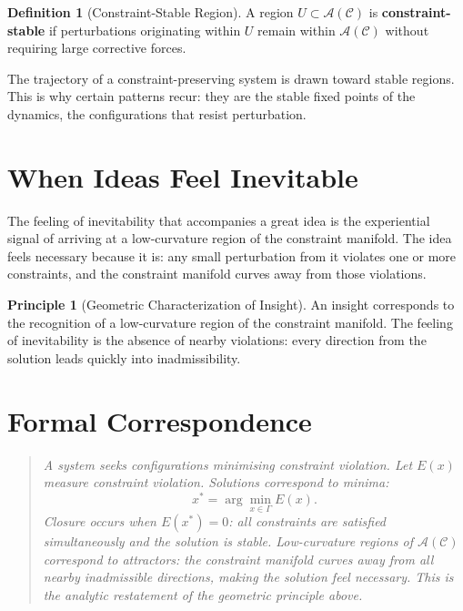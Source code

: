 \documentclass[11pt]{book}
\theoremstyle{plain}
\theoremstyle{definition}
\newtheorem{definition}[theorem]{Definition}
\newtheorem{principle}[theorem]{Principle}
\theoremstyle{remark}
\newcommand{\C}{\mathcal{C}}
\newcommand{\A}{\mathcal{A}}
\newenvironment{formalcorrespondence}
  {\begin{quote}\small\itshape}
  {\end{quote}}
\begin{document}
\begin{definition}[Constraint-Stable Region]
A region $U \subset \A(\C)$ is \textbf{constraint-stable} if perturbations
originating within $U$ remain within $\A(\C)$ without requiring large
corrective forces.
\end{definition}

The trajectory of a constraint-preserving system is drawn toward stable
regions. This is why certain patterns recur: they are the stable fixed
points of the dynamics, the configurations that resist perturbation.

\section{When Ideas Feel Inevitable}

The feeling of inevitability that accompanies a great idea is the
experiential signal of arriving at a low-curvature region of the constraint
manifold. The idea feels necessary because it is: any small perturbation
from it violates one or more constraints, and the constraint manifold
curves away from those violations.

\begin{principle}[Geometric Characterization of Insight]
An insight corresponds to the recognition of a low-curvature region of
the constraint manifold. The feeling of inevitability is the absence of
nearby violations: every direction from the solution leads quickly into
inadmissibility.
\end{principle}

\section*{Formal Correspondence}
\begin{formalcorrespondence}
A system seeks configurations minimising constraint violation. Let
$E(x)$ measure constraint violation. Solutions correspond to minima:
\[
  x^* = \arg\min_{x \in \Gamma} E(x).
\]
Closure occurs when $E(x^*) = 0$: all constraints are satisfied
simultaneously and the solution is stable. Low-curvature regions of
$\A(\C)$ correspond to attractors: the constraint manifold curves away
from all nearby inadmissible directions, making the solution feel
necessary. This is the analytic restatement of the geometric principle
above.
\end{formalcorrespondence}
\end{document}
